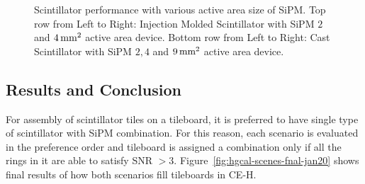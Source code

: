 \begin{figure}
  \caption[Scintillator performance with various active area size
    of \gls{SiPM}]{Scintillator performance with various active area size
    of \gls{SiPM}. Top row from Left to Right: Injection Molded
    Scintillator with \gls{SiPM} \( 2 \) and \( 4\,\text{mm}{}^2 \) active area device.
    Bottom row from Left to Right: Cast Scintillator with
    \gls{SiPM} \( 2,4 \) and \( 9\,\text{mm}{}^2 \) active area device.}%
  \label{fig:hgcal-scint-everywhere}
\end{figure}

\subsection{
  Results and Conclusion
}

For assembly of scintillator tiles on a tileboard, it is preferred
to have single type of scintillator with \gls{SiPM} combination.
For this reason, each scenario is evaluated in the preference order
and tileboard is assigned a combination only
if all the rings in it are able to satisfy \gls{SNR} \( > 3\).
Figure~\ref{fig:hgcal-scenes-fnal-jan20} shows final
results of how both scenarios fill tileboards in \gls{CE-H}.

